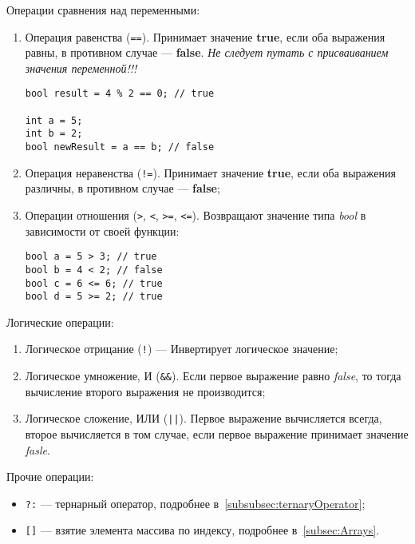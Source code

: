 Операции сравнения над переменными:
\begin{enumerate}
    \item Операция равенства (\lstinline{==}). Принимает значение \textbf{true}, если оба выражения равны, в противном случае --- \textbf{false}. \textit{Не следует путать с присваиванием значения переменной!!!}

    \begin{lstlisting}
bool result = 4 % 2 == 0; // true

int a = 5;
int b = 2;
bool newResult = a == b; // false
    \end{lstlisting}

    \item Операция неравенства (\lstinline{!=}). Принимает значение \textbf{true}, если оба выражения различны, в противном случае --- \textbf{false};
    \item Операции отношения (\lstinline{>}, \lstinline{<}, \lstinline{>=}, \lstinline{<=}). Возвращают значение типа \textit{bool} в зависимости от своей функции:

    \begin{lstlisting}
bool a = 5 > 3; // true
bool b = 4 < 2; // false
bool c = 6 <= 6; // true
bool d = 5 >= 2; // true
    \end{lstlisting}
\end{enumerate}

Логические операции:

\begin{enumerate}
    \item Логическое отрицание (\lstinline{!}) --- Инвертирует логическое значение;
    \item Логическое умножение, И (\lstinline{&&}). Если первое выражение равно \textit{false}, то тогда вычисление второго выражения не производится;
    \item Логическое сложение, ИЛИ (\lstinline{||}). Первое выражение вычисляется всегда, второе вычисляется в том случае, если первое выражение принимает значение \textit{fasle}.
\end{enumerate}

Прочие операции:
\begin{itemize}
    \item \lstinline{?:} --- тернарный оператор, подробнее в~\ref{subsubsec:ternaryOperator};
    \item \lstinline{[]} --- взятие элемента массива по индексу, подробнее в~\ref{subsec:Arrays}.
\end{itemize}

